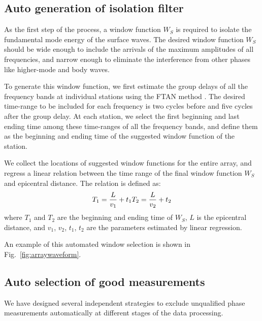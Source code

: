 \subsection{Auto generation of isolation filter}
As the first step of the process, a window function $W_S$ is required to isolate the fundamental mode energy of the surface waves. The desired window function $W_S$ should be wide enough to include the arrivals of the maximum amplitudes of all frequencies, and narrow enough to eliminate the interference from other phases like higher-mode and body waves. 

To generate this window function, we first estimate the group delays of all the frequency bands at individual stations using the FTAN method \citep{Levshin:1992ve}. The desired time-range to be included for each frequency is two cycles before and five cycles after the group delay. At each station, we select the first beginning and last ending time among these time-ranges of all the frequency bands, and define them as the beginning and ending time of the suggested window function of the station.

We collect the locations of suggested window functions for the entire array, and regress a linear relation between the time range of the final window function $W_S$ and epicentral distance. The relation is defined as:
\begin{equation}
T_1 = \frac{L}{v_1} + t_1 \\
T_2 = \frac{L}{v_2} + t_2
\end{equation}
where $T_1$ and $T_2$ are the beginning and ending time of $W_S$, $L$ is the epicentral distance, and $v_1$, $v_2$, $t_1$, $t_2$ are the parameters estimated by linear regression.

An example of this automated window selection is shown in Fig.~\ref{fig:arraywaveform}.


\subsection{Auto selection of good measurements}
\label{sec:data_selection}

We have designed several independent strategies to exclude unqualified phase measurements automatically at different stages of the data processing.

